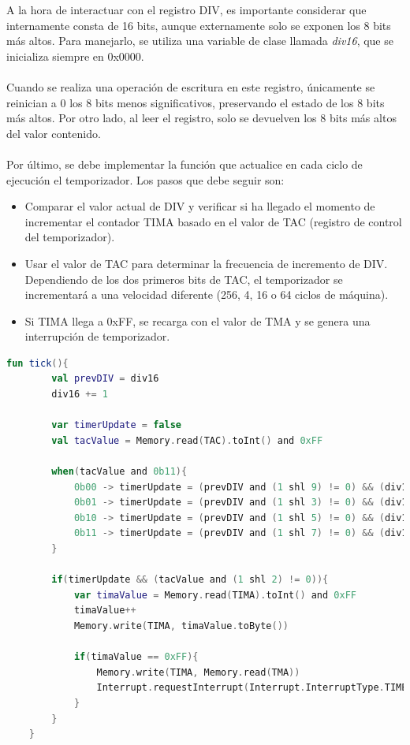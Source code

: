 A la hora de interactuar con el registro DIV, es importante considerar que internamente consta de 16 bits, aunque externamente solo se exponen los 8 bits más altos. Para manejarlo, se utiliza una variable de clase llamada \textit{div16}, que se inicializa siempre en 0x0000.
\\\\
Cuando se realiza una operación de escritura en este registro, únicamente se reinician a 0 los 8 bits menos significativos, preservando el estado de los 8 bits más altos. Por otro lado, al leer el registro, solo se devuelven los 8 bits más altos del valor contenido.
\\\\
Por último, se debe implementar la función que actualice en cada ciclo de ejecución el temporizador. Los pasos que debe seguir son:

\begin{itemize}
    \item Comparar el valor actual de DIV y verificar si ha llegado el momento de incrementar el contador TIMA basado en el valor de TAC (registro de control del temporizador).
    \item Usar el valor de TAC para determinar la frecuencia de incremento de DIV. Dependiendo de los dos primeros bits de TAC, el temporizador se incrementará a una velocidad diferente (256, 4, 16 o 64 ciclos de máquina).
    \item Si TIMA llega a 0xFF, se recarga con el valor de TMA y se genera una interrupción de temporizador.
\end{itemize}

\begin{lstlisting}[language=Kotlin, caption={Lectura y escritura en registros de Timers.}, label={code:timertick}]
    fun tick(){
        val prevDIV = div16
        div16 += 1

        var timerUpdate = false
        val tacValue = Memory.read(TAC).toInt() and 0xFF

        when(tacValue and 0b11){
            0b00 -> timerUpdate = (prevDIV and (1 shl 9) != 0) && (div16 and (1 shl 9) == 0)
            0b01 -> timerUpdate = (prevDIV and (1 shl 3) != 0) && (div16 and (1 shl 3) == 0)
            0b10 -> timerUpdate = (prevDIV and (1 shl 5) != 0) && (div16 and (1 shl 5) == 0)
            0b11 -> timerUpdate = (prevDIV and (1 shl 7) != 0) && (div16 and (1 shl 7) == 0)
        }

        if(timerUpdate && (tacValue and (1 shl 2) != 0)){
            var timaValue = Memory.read(TIMA).toInt() and 0xFF
            timaValue++
            Memory.write(TIMA, timaValue.toByte())

            if(timaValue == 0xFF){
                Memory.write(TIMA, Memory.read(TMA))
                Interrupt.requestInterrupt(Interrupt.InterruptType.TIMER.getByteMask())
            }
        }
    }
\end{lstlisting}

